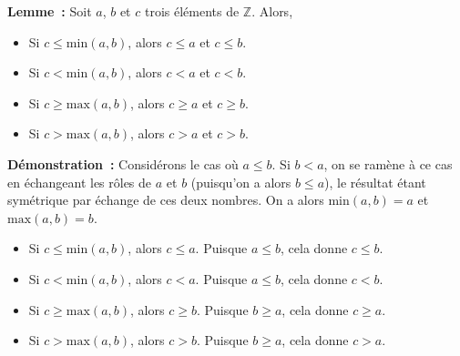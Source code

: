 \medskip

\noindent\textbf{Lemme :} Soit $a$, $b$ et $c$ trois éléments de $\mathbb{Z}$. 
    Alors, 
    \begin{itemize}[nosep]
        \item Si $c \leq \mathrm{min}(a,b)$, alors $c \leq a$ et $c \leq b$.
        \item Si $c < \mathrm{min}(a,b)$, alors $c < a$ et $c < b$.
        \item Si $c \geq \mathrm{max}(a,b)$, alors $c \geq a$ et $c \geq b$.
        \item Si $c > \mathrm{max}(a,b)$, alors $c > a$ et $c > b$.
    \end{itemize}

\medskip

\noindent\textbf{Démonstration :} 
    Considérons le cas où $a \leq b$. 
    Si $b < a$, on se ramène à ce cas en échangeant les rôles de $a$ et $b$ (puisqu'on a alors $b \leq a$), le résultat étant symétrique par échange de ces deux nombres.
    On a alors $\mathrm{min}(a, b) = a$ et $\mathrm{max}(a, b) = b$.
    \begin{itemize}[nosep]
        \item Si $c \leq \mathrm{min}(a,b)$, alors $c \leq a$.
            Puisque $a \leq b$, cela donne $c \leq b$.
        \item Si $c < \mathrm{min}(a,b)$, alors $c < a$.
            Puisque $a \leq b$, cela donne $c < b$.
        \item Si $c \geq \mathrm{max}(a,b)$, alors $c \geq b$.
            Puisque $b \geq a$, cela donne $c \geq a$.
        \item Si $c > \mathrm{max}(a,b)$, alors $c > b$.
            Puisque $b \geq a$, cela donne $c > a$.
    \end{itemize}

    \hfill \square

